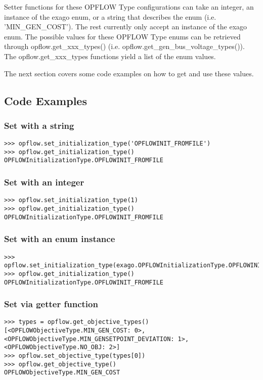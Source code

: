 Setter functions for these OPFLOW Type configurations can take an integer, an instance of the exago enum, or a string that describes the enum (i.e. 'MIN\_GEN\_COST'). The rest currently only accept an instance of the exago enum. The possible values for these OPFLOW Type enums can be retrieved through opflow.get\_xxx\_types() (i.e. opflow.get\_gen\_bus\_voltage\_types()). The opflow.get\_xxx\_types functions yield a list of the enum values.

The next section covers some code examples on how to get and use these values.

\subsection{Code Examples}

\subsubsection{Set with a string}
\begin{lstlisting}
>>> opflow.set_initialization_type('OPFLOWINIT_FROMFILE')
>>> opflow.get_initialization_type()
OPFLOWInitializationType.OPFLOWINIT_FROMFILE
\end{lstlisting}

\subsubsection{Set with an integer}
\begin{lstlisting}
>>> opflow.set_initialization_type(1)
>>> opflow.get_initialization_type()
OPFLOWInitializationType.OPFLOWINIT_FROMFILE
\end{lstlisting}


\subsubsection{Set with an enum instance}
\begin{lstlisting}
>>> opflow.set_initialization_type(exago.OPFLOWInitializationType.OPFLOWINIT_FROMFILE)
>>> opflow.get_initialization_type()
OPFLOWInitializationType.OPFLOWINIT_FROMFILE
\end{lstlisting}

\subsubsection{Set via getter function}
\begin{lstlisting}
>>> types = opflow.get_objective_types()
[<OPFLOWObjectiveType.MIN_GEN_COST: 0>, <OPFLOWObjectiveType.MIN_GENSETPOINT_DEVIATION: 1>, <OPFLOWObjectiveType.NO_OBJ: 2>]
>>> opflow.set_objective_type(types[0])
>>> opflow.get_objective_type()
OPFLOWObjectiveType.MIN_GEN_COST
\end{lstlisting}


